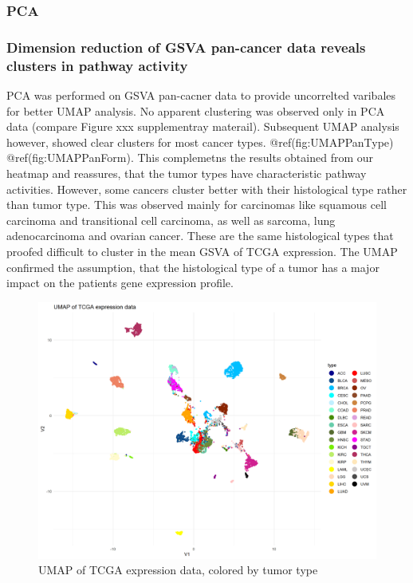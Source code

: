 \documentclass[
]{article}
\begin{document}
\hypertarget{pca}{%
\subsubsection{PCA}\label{pca}}

\hypertarget{dimension-reduction-of-gsva-pan-cancer-data-reveals-clusters-in-pathway-activity}{%
\subsubsection{Dimension reduction of GSVA pan-cancer data reveals
clusters in pathway
activity}\label{dimension-reduction-of-gsva-pan-cancer-data-reveals-clusters-in-pathway-activity}}

PCA was performed on GSVA pan-cacner data to provide uncorrelted
varibales for better UMAP analysis. No apparent clustering was observed
only in PCA data (compare Figure xxx supplementray materail). Subsequent
UMAP analysis however, showed clear clusters for most cancer types.
@ref(fig:UMAPPanType) @ref(fig:UMAPPanForm). This complemetns the
results obtained from our heatmap and reassures, that the tumor types
have characteristic pathway activities. However, some cancers cluster
better with their histological type rather than tumor type. This was
observed mainly for carcinomas like squamous cell carcinoma and
transitional cell carcinoma, as well as sarcoma, lung adenocarcinoma and
ovarian cancer. These are the same histological types that proofed
difficult to cluster in the mean GSVA of TCGA expression. The UMAP
confirmed the assumption, that the histological type of a tumor has a
major impact on the patients gene expression profile.

\begin{figure}

{\centering \includegraphics[width=0.5\linewidth]{figures/Pan Cancer UMAP} 

}

\caption{UMAP of TCGA expression data, colored by tumor type}\label{fig:UMAPPanType}
\end{figure}
\end{document}

